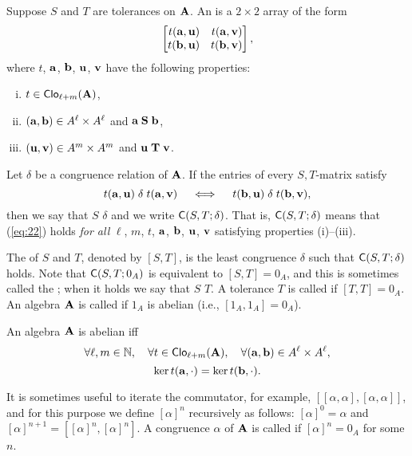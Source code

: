 Suppose $S$ and $T$ are tolerances on $\mathbf{A}$.  An  
is a $2\times 2$ array of the form
\[
\begin{bmatrix*}[r] t(\ba,\bu) & t(\ba,\bv)\\ t(\bb,\bu)&t(\bb,\bv)\end{bmatrix*},
\]
where $t$, $\mathbf{a}$, $\mathbf{b}$, $\mathbf{u}$, $\mathbf{v}$ have the following properties:
\begin{enumerate}[(i)] %
\item $t\in \operatorname{\mathsf{Clo}}_{\ell + m}(\mathbf{A})$,
\item $(\mathbf{a}, \mathbf{b})\in A^\ell\times A^\ell$ and $\mathbf{a} \mathrel{\mathbf{S}} \mathbf{b}$,
\item $(\mathbf{u}, \mathbf{v})\in A^m\times A^m$ and $\mathbf{u} \mathrel{\mathbf{T}} \mathbf{v}$.
\end{enumerate}
Let $\delta$ be a congruence relation of $\mathbf{A}$.
If the entries of every $S,T$-matrix satisfy
\begin{equation}
  \label{eq:22}
t(\mathbf{a},\mathbf{u}) \mathrel{\delta} t(\mathbf{a},\mathbf{v})\quad \iff \quad t(\mathbf{b},\mathbf{u}) \mathrel{\delta} t(\mathbf{b},\mathbf{v}),
\end{equation}
then we say that $S$  $\delta$ and we write 
$\mathsf{C}(S, T; \delta)$.
That is, $\mathsf{C}(S, T; \delta)$  means that 
(\ref{eq:22}) holds \emph{for all}
$\ell$, $m$, $t$, $\mathbf{a}$, $\mathbf{b}$, $\mathbf{u}$, $\mathbf{v}$ satisfying properties (i)--(iii).

The  of $S$ and $T$, denoted by $[S, T]$,
is the least congruence $\delta$ such that $\mathsf{C}(S, T; \delta)$ 
holds.  
Note that $\mathsf{C}(S, T; 0_A)$ is equivalent to $[S,T] = 0_A$, and this
is sometimes called the ;
when it holds we say  that
$S$  $T$. %
A tolerance $T$ is called  if
$[T, T] = 0_A$.  
An algebra $\mathbf{A}$ is called  if $1_A$ is abelian
(i.e., $[1_A,1_A] = 0_A$).

\begin{rem}
  An algebra $\mathbf{A}$ is abelian iff %
  \[
  \forall \ell, m \in \mathbb{N},
  \quad \forall t\in \operatorname{\mathsf{Clo}}_{\ell + m}(\mathbf{A}),
  \quad \forall (\mathbf{a}, \mathbf{b})\in A^\ell\times A^\ell,
  \]
  \[
  \ker t(\mathbf{a}, \cdot)=\ker t(\mathbf{b}, \cdot).
  \]
\end{rem}

It is sometimes useful to iterate the commutator, for example,
$[[\alpha, \alpha], [\alpha, \alpha]]$, and for this purpose
we define $[\alpha]^n$ recursively as
follows:
$[\alpha]^0 = \alpha$ and
$[\alpha]^{n+1} = [[\alpha]^n, [\alpha]^n]$.  A congruence $\alpha$ of $\mathbf{A}$
is called  if $[\alpha]^n = 0_A$ for some $n$.

